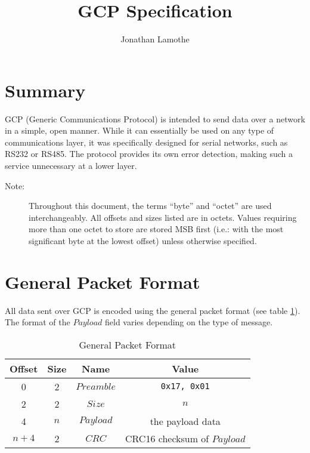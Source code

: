 \documentclass{article}
\title{GCP Specification}
\author{Jonathan Lamothe}
\begin{document}
\maketitle

\section{Summary}
GCP (Generic Communications Protocol) is intended to send data over a
network in a simple, open manner.  While it can essentially be used on
any type of communications layer, it was specifically designed for
serial networks, such as RS232 or RS485.  The protocol provides its
own error detection, making such a service unnecessary at a lower
layer.

\begin{description}
  \item[Note:]Throughout this document, the terms ``byte'' and
    ``octet'' are used interchangeably.  All offsets and sizes listed
    are in octets.  Values requiring more than one octet to store are
    stored MSB first (i.e.: with the most significant byte at the
    lowest offset) unless otherwise specified.
\end{description}

\section{General Packet Format}
All data sent over GCP is encoded using the general packet format (see
table \ref{tab:gen-pkt-fmt}).  The format of the $Payload$ field
varies depending on the type of message.

\begin{table}[hbp]
  \center
  \begin{tabular}{cccc}
    \textbf{Offset} & \textbf{Size} & \textbf{Name} & \textbf{Value}\\
    \hline
    0 & 2 & $Preamble$ & \texttt{0x17, 0x01}\\
    2 & 2 & $Size$ & $n$\\
    4 & $n$ & $Payload$ & the payload data\\
    $n + 4$ & 2 & $CRC$ & CRC16 checksum of $Payload$\\
    \hline
  \end{tabular}
  \caption{General Packet Format\label{tab:gen-pkt-fmt}}
\end{table}
\end{document}
